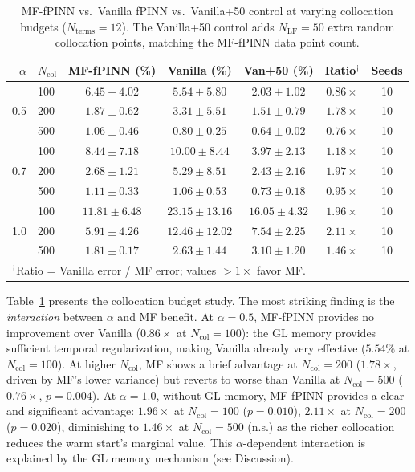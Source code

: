 \documentclass[11pt]{article}
\newcommand{\Ncol}{N_{\mathrm{col}}}
\newcommand{\NLF}{N_{\mathrm{LF}}}
\begin{document}
\begin{table}[t]
\centering
\caption{MF-fPINN vs.\ Vanilla fPINN vs.\ Vanilla+50 control at varying collocation budgets ($N_{\mathrm{terms}} = 12$). The Vanilla+50 control adds $\NLF = 50$ extra random collocation points, matching the MF-fPINN data point count.}
\label{tab:ncol}
\begin{tabular}{rlccccc}
\toprule
$\alpha$ & $\Ncol$ & MF-fPINN (\%) & Vanilla (\%) & Van+50 (\%) & Ratio$^\dagger$ & Seeds \\
\midrule
\multirow{3}{*}{0.5}
 & 100 & $6.45 \pm 4.02$ & $5.54 \pm 5.80$ & $2.03 \pm 1.02$ & $0.86\times$ & 10 \\
 & 200 & $1.87 \pm 0.62$ & $3.31 \pm 5.51$ & $1.51 \pm 0.79$ & $1.78\times$ & 10 \\
 & 500 & $1.06 \pm 0.46$ & $0.80 \pm 0.25$ & $0.64 \pm 0.02$ & $0.76\times$ & 10 \\
\midrule
\multirow{3}{*}{0.7}
 & 100 & $8.44 \pm 7.18$ & $10.00 \pm 8.44$ & $3.97 \pm 2.13$ & $1.18\times$ & 10 \\
 & 200 & $2.68 \pm 1.21$ & $5.29 \pm 8.51$ & $2.43 \pm 2.16$ & $1.97\times$ & 10 \\
 & 500 & $1.11 \pm 0.33$ & $1.06 \pm 0.53$ & $0.73 \pm 0.18$ & $0.95\times$ & 10 \\
\midrule
\multirow{3}{*}{1.0}
 & 100 & $11.81 \pm 6.48$ & $23.15 \pm 13.16$ & $16.05 \pm 4.32$ & $\mathbf{1.96\times}$ & 10 \\
 & 200 & $5.91 \pm 4.26$ & $12.46 \pm 12.02$ & $7.54 \pm 2.25$ & $\mathbf{2.11\times}$ & 10 \\
 & 500 & $1.81 \pm 0.17$ & $2.63 \pm 1.44$ & $3.10 \pm 1.20$ & $1.46\times$ & 10 \\
\bottomrule
\multicolumn{7}{l}{\small $^\dagger$Ratio = Vanilla error / MF error; values $>1\times$ favor MF.} \\
\end{tabular}
\end{table}

Table~\ref{tab:ncol} presents the collocation budget study. The most striking finding is the \emph{interaction} between $\alpha$ and MF benefit. At $\alpha = 0.5$, MF-fPINN provides no improvement over Vanilla ($0.86\times$ at $\Ncol = 100$): the GL memory provides sufficient temporal regularization, making Vanilla already very effective ($5.54\%$ at $\Ncol = 100$). At higher $\Ncol$, MF shows a brief advantage at $\Ncol = 200$ ($1.78\times$, driven by MF's lower variance) but reverts to worse than Vanilla at $\Ncol = 500$ ($0.76\times$, $p = 0.004$). At $\alpha = 1.0$, without GL memory, MF-fPINN provides a clear and significant advantage: $\mathbf{1.96\times}$ at $\Ncol = 100$ ($p = 0.010$), $\mathbf{2.11\times}$ at $\Ncol = 200$ ($p = 0.020$), diminishing to $1.46\times$ at $\Ncol = 500$ (n.s.) as the richer collocation reduces the warm start's marginal value. This $\alpha$-dependent interaction is explained by the GL memory mechanism (see Discussion).
\end{document}
